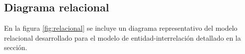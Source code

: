 \documentclass[a4paper,11pt]{article}
\begin{document}
%
%
%
%
%
%
%
%
%
%
%
%
%
%
%
%
%
%

\newpage

\subsection{Diagrama relacional}

 En la figura \ref{fig:relacional} se incluye un diagrama representativo del
 modelo relacional desarrollado para el modelo de entidad-interrelación
 detallado en la sección.
\end{document}
